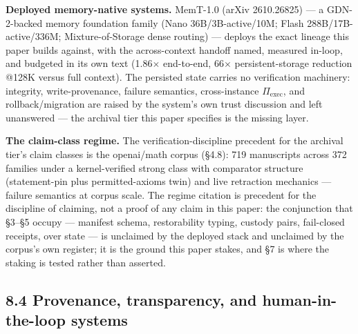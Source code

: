 \documentclass[11pt]{article}
\begin{document}
\textbf{Deployed memory-native systems.} MemT-1.0 (arXiv 2610.26825) --- a GDN-2-backed memory foundation family (Nano 36B/3B-active/10M; Flash 288B/17B-active/336M; Mixture-of-Storage dense routing) --- deploys the exact lineage this paper builds against, with the across-context handoff named, measured in-loop, and budgeted in its own text (1.86\(\times\) end-to-end, 66\(\times\) persistent-storage reduction @128K versus full context). The persisted state carries no verification machinery: integrity, write-provenance, failure semantics, cross-instance \(\Pi_{\text{exec}}\), and rollback/migration are raised by the system's own trust discussion and left unanswered --- the archival tier this paper specifies is the missing layer.

\textbf{The claim-class regime.} The verification-discipline precedent for the archival tier's claim classes is the openai/math corpus (\S{}4.8): 719 manuscripts across 372 families under a kernel-verified strong class with comparator structure (statement-pin plus permitted-axioms twin) and live retraction mechanics --- failure semantics at corpus scale. The regime citation is precedent for the discipline of claiming, not a proof of any claim in this paper: the conjunction that \S{}3--\S{}5 occupy --- manifest schema, restorability typing, custody pairs, fail-closed receipts, over state --- is unclaimed by the deployed stack and unclaimed by the corpus's own register; it is the ground this paper stakes, and \S{}7 is where the staking is tested rather than asserted.

\subsection{8.4 Provenance, transparency, and human-in-the-loop systems}\label{provenance-transparency-and-human-in-the-loop-systems}
\end{document}

